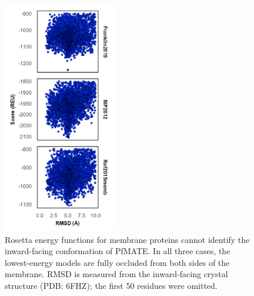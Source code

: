 \begin{figure}[h]
\centering
\includegraphics[width=2in]{Figures/multilateration_supp_scores.pdf}
\caption[Rosetta energy functions for membrane proteins cannot identify the inward-facing conformation of PfMATE.]{Rosetta energy functions for membrane proteins cannot identify the inward-facing conformation of PfMATE.  In all three cases, the lowest-energy models are fully occluded from both sides of the membrane. RMSD is measured from the inward-facing crystal structure (PDB: 6FHZ); the first 50 residues were omitted.}
\label{fig:multilateration_supp_scores}
\end{figure}